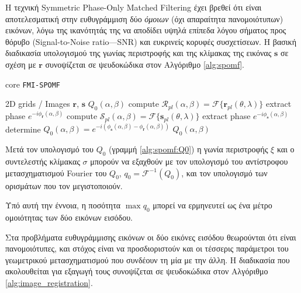 Η τεχνική Symmetric Phase-Only Matched Filtering \cite{Qin-ShengChen1994a} έχει
βρεθεί ότι είναι αποτελεσματική στην ευθυγράμμιση δύο \textit{όμοιων} (όχι
απαραίτητα πανομοιότυπων) εικόνων, λόγω της ικανότητάς της να αποδίδει υψηλά
επίπεδα λόγου σήματος προς θόρυβο (Signal-to-Noise ratio---SNR) και ευκρινείς
κορυφές συσχετίσεων. Η βασική διαδικασία υπολογισμού της γωνίας περιστροφής και
της κλίμακας της εικόνας $\bm{s}$ σε σχέση με $\bm{r}$ συνοψίζεται σε
ψευδοκώδικα στον Αλγόριθμο \ref{alg:spomf}.

\begin{algorithm}
  \caption{core \texttt{FMI-SPOMF}}
  \label{alg:spomf}
  \begin{spacing}{1.2}
  \begin{algorithmic}[1]
    \REQUIRE 2D grids / Images $\bm{r}$, $\bm{s}$
    \ENSURE $Q_0(\alpha,\beta)$
    \STATE compute $\mathcal{R}_{pl}(\alpha,\beta) = \mathcal{F}\{\bm{r}_{pl}(\theta,\lambda)\}$
    \STATE extract phase $e^{-i\phi_{\bm{r}}(\alpha, \beta)}$
    \STATE compute $\mathcal{S}_{pl}(\alpha,\beta) = \mathcal{F}\{\bm{s}_{pl}(\theta,\lambda)\}$
    \STATE extract phase $e^{-i\phi_{\bm{s}}(\alpha, \beta)}$
    \STATE determine $Q_0(\alpha, \beta) = e^{-i(\phi_{\bm{s}}(\alpha, \beta)-\phi_{\bm{r}}(\alpha, \beta))}$ \label{alg:spomf:Q0}
    \RETURN $Q_0(\alpha,\beta)$
  \end{algorithmic}
  \end{spacing}
\end{algorithm}
Μετά τον υπολογισμό του $Q_0$ (γραμμή \ref{alg:spomf:Q0}) η γωνία περιστροφής
$\xi$ και ο συντελεστής κλίμακας $\sigma$ μπορούν να εξαχθούν με τον υπολογισμό
του αντίστροφου μετασχηματισμού Fourier του $Q_0$, $q_0 =
\mathcal{F}^{-1}(Q_0)$, και τον υπολογισμό των ορισμάτων που τον μεγιστοποιούν.

\begin{gg_box}
  \begin{remark}
    \label{remark:01_01_02:q0_similarity_measure}
    Υπό αυτή την έννοια, η ποσότητα $\max q_0$ μπορεί να ερμηνευτεί ως ένα μέτρο
    ομοιότητας των δύο εικόνων εισόδου.
  \end{remark}
\end{gg_box}

Στα προβλήματα ευθυγράμμισης εικόνων οι δύο εικόνες εισόδου θεωρούνται ότι
είναι πανομοιότυπες, και στόχος είναι να προσδιοριστούν και οι τέσσερις
παράμετροι του γεωμετρικού μετασχηματισμού που συνδέουν τη μία με την άλλη. Η
διαδικασία που ακολουθείται για εξαγωγή τους συνοψίζεται σε ψευδοκώδικα
στον Αλγόριθμο \ref{alg:image_registration}.

